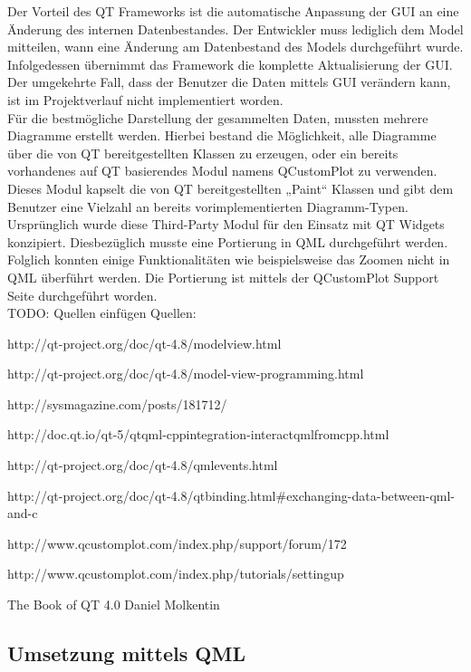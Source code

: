 Der Vorteil des QT Frameworks ist die automatische Anpassung der GUI an eine Änderung des internen Datenbestandes. Der Entwickler muss lediglich dem Model mitteilen, wann eine Änderung am Datenbestand des Models durchgeführt wurde. Infolgedessen übernimmt das Framework die komplette Aktualisierung der GUI. Der umgekehrte Fall, dass der Benutzer die Daten mittels GUI verändern kann, ist im Projektverlauf nicht implementiert worden. \\

Für die bestmögliche Darstellung der gesammelten Daten, mussten mehrere Diagramme erstellt werden. Hierbei bestand die Möglichkeit, alle Diagramme über die von QT bereitgestellten Klassen zu erzeugen, oder ein bereits vorhandenes auf QT basierendes Modul namens QCustomPlot zu verwenden. Dieses Modul kapselt die von QT bereitgestellten „Paint“ Klassen und gibt dem Benutzer eine Vielzahl an bereits vorimplementierten Diagramm-Typen. Ursprünglich wurde diese Third-Party Modul für den Einsatz mit QT Widgets konzipiert. Diesbezüglich musste eine Portierung in QML durchgeführt werden. Folglich konnten einige Funktionalitäten wie beispielsweise das Zoomen nicht in QML überführt werden. Die Portierung ist mittels der QCustomPlot Support Seite durchgeführt worden. \\

TODO: Quellen einfügen
Quellen:

http://qt-project.org/doc/qt-4.8/modelview.html

http://qt-project.org/doc/qt-4.8/model-view-programming.html

http://sysmagazine.com/posts/181712/

http://doc.qt.io/qt-5/qtqml-cppintegration-interactqmlfromcpp.html

http://qt-project.org/doc/qt-4.8/qmlevents.html

http://qt-project.org/doc/qt-4.8/qtbinding.html\#exchanging-data-between-qml-and-c

http://www.qcustomplot.com/index.php/support/forum/172

http://www.qcustomplot.com/index.php/tutorials/settingup

The Book of QT 4.0 Daniel Molkentin


\subsection{Umsetzung mittels QML}

